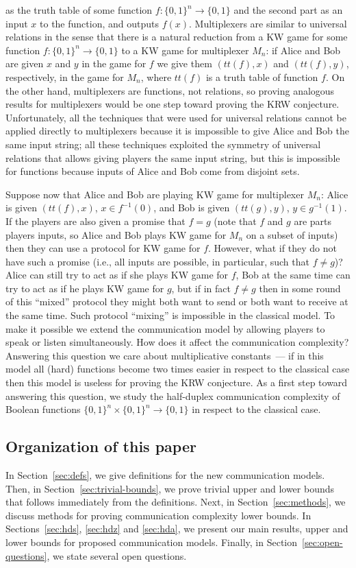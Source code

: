 as the truth table of some function $f:\{0,1\}^n\to\{0,1\}$ and the second part as an input $x$ to the function, and outputs $f(x)$. 
Multiplexers are similar to universal relations in the sense that there is a natural reduction 
from a KW game for some function $f:\{0,1\}^n\to\{0,1\}$ to a KW game for multiplexer $M_n$: if Alice and Bob are given $x$ and $y$ in the game for $f$ we give them $(tt(f), x)$ 
and $(tt(f),y)$, respectively, in the game for $M_n$, where $tt(f)$ is a truth table of function $f$. 
On the other hand, multiplexers are functions, not relations, so proving analogous
results for multiplexers would be one step toward proving the KRW conjecture.
Unfortunately, all the techniques that were used for universal relations cannot be applied directly 
to multiplexers because it is impossible to give Alice and Bob the same input string; all these techniques exploited the symmetry of universal relations that allows giving players the same input string, but this is impossible for functions because inputs of Alice and Bob come from disjoint sets.

Suppose now that Alice and Bob are playing KW game for multiplexer $M_n$: Alice is
given $(tt(f), x)$, $x\in f^{-1}(0)$, and Bob is given $(tt(g), y)$, $y\in g^{-1}(1)$. If the
players are also given a promise that $f=g$ (note that $f$ and $g$ are parts players inputs, so Alice and Bob plays KW game for $M_n$ on a subset of inputs) then they can use a protocol for KW 
game for $f$. 
However, what if they do not have such a promise (i.e., all inputs are possible, in particular, such that $f\neq g$)?
Alice can still try to act as if she plays KW game for $f$, 
Bob at the same time can try to act as if he plays KW game for $g$,
but if in fact $f\neq g$ then in some round of this ``mixed'' protocol they might
both want to send or both want to receive at the same time.  
Such protocol ``mixing'' is impossible in the classical model. 
To make it possible we extend the communication model by allowing players to speak or listen simultaneously. How does it affect the communication complexity? Answering this question we care about multiplicative constants~--- 
if in this model all (hard) functions become two times easier in respect to the classical case then this model is useless for proving the KRW conjecture.
As a first step toward answering this question, we study the half-duplex communication complexity of Boolean functions $\{0,1\}^n\times\{0,1\}^n\to \{0,1\}$ in respect to the classical case. 

\subsection{Organization of this paper}
In Section~\ref{sec:defs}, we give definitions for the new communication models. Then, in Section~\ref{sec:trivial-bounds}, we prove trivial upper and lower bounds that follows immediately from the definitions. Next, in Section~\ref{sec:methods}, we discuss methods for proving communication complexity lower bounds. In Sections~\ref{sec:hds}, \ref{sec:hdz} and \ref{sec:hda}, we present our main results, upper and lower bounds for proposed communication models. Finally, in Section~\ref{sec:open-questions}, we state several open questions.

